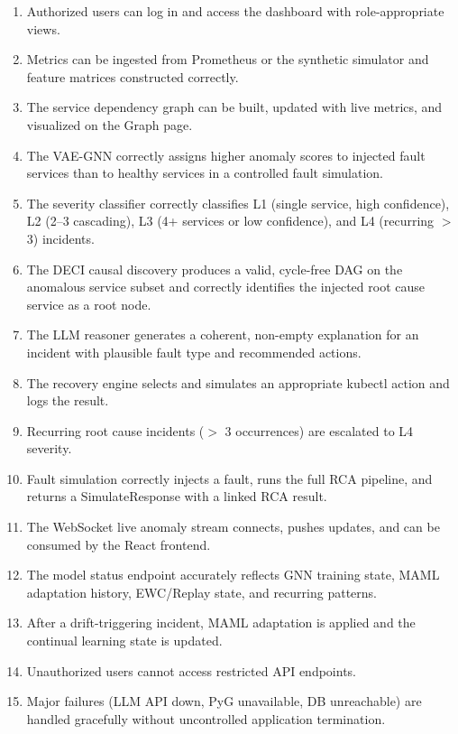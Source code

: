 \documentclass[11pt,a4paper]{article}
\begin{document}
\begin{enumerate}
    \item Authorized users can log in and access the dashboard with role-appropriate views.
    \item Metrics can be ingested from Prometheus or the synthetic simulator and feature matrices constructed correctly.
    \item The service dependency graph can be built, updated with live metrics, and visualized on the Graph page.
    \item The VAE-GNN correctly assigns higher anomaly scores to injected fault services than to healthy services in a controlled fault simulation.
    \item The severity classifier correctly classifies L1 (single service, high confidence), L2 (2--3 cascading), L3 (4+ services or low confidence), and L4 (recurring $>$ 3) incidents.
    \item The DECI causal discovery produces a valid, cycle-free DAG on the anomalous service subset and correctly identifies the injected root cause service as a root node.
    \item The LLM reasoner generates a coherent, non-empty explanation for an incident with plausible fault type and recommended actions.
    \item The recovery engine selects and simulates an appropriate kubectl action and logs the result.
    \item Recurring root cause incidents ($>$ 3 occurrences) are escalated to L4 severity.
    \item Fault simulation correctly injects a fault, runs the full RCA pipeline, and returns a SimulateResponse with a linked RCA result.
    \item The WebSocket live anomaly stream connects, pushes updates, and can be consumed by the React frontend.
    \item The model status endpoint accurately reflects GNN training state, MAML adaptation history, EWC/Replay state, and recurring patterns.
    \item After a drift-triggering incident, MAML adaptation is applied and the continual learning state is updated.
    \item Unauthorized users cannot access restricted API endpoints.
    \item Major failures (LLM API down, PyG unavailable, DB unreachable) are handled gracefully without uncontrolled application termination.
\end{enumerate}


\FloatBarrier
\end{document}
